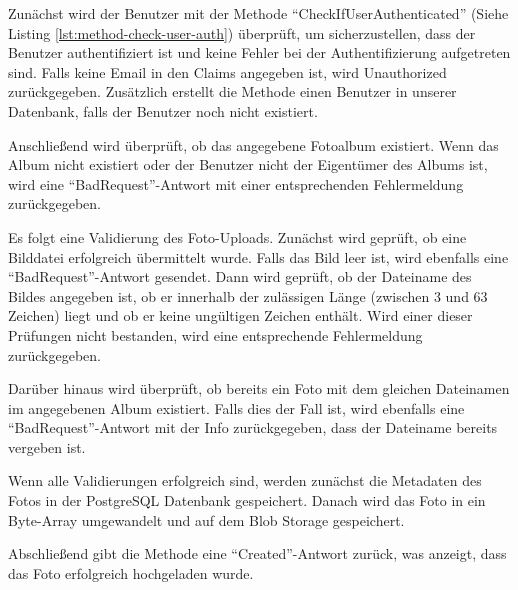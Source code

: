 Zunächst wird der Benutzer mit der Methode ``CheckIfUserAuthenticated'' (Siehe Listing 
\ref{lst:method-check-user-auth}) überprüft, um sicherzustellen, dass der Benutzer 
authentifiziert ist und keine Fehler bei der Authentifizierung aufgetreten sind. 
Falls keine Email in den Claims angegeben ist, wird Unauthorized zurückgegeben. 
Zusätzlich erstellt die Methode einen Benutzer in unserer Datenbank, falls
der Benutzer noch nicht existiert.

Anschließend wird überprüft, ob das angegebene Fotoalbum existiert. Wenn das 
Album nicht existiert oder der Benutzer nicht der Eigentümer des Albums ist, 
wird eine ``BadRequest''-Antwort mit einer entsprechenden Fehlermeldung zurückgegeben.

Es folgt eine Validierung des Foto-Uploads. Zunächst wird geprüft, ob eine Bilddatei 
erfolgreich übermittelt wurde. Falls das Bild leer ist, wird ebenfalls eine 
``BadRequest''-Antwort gesendet. Dann wird geprüft, ob der Dateiname des Bildes 
angegeben ist, ob er innerhalb der zulässigen Länge (zwischen 3 und 63 Zeichen) liegt 
und ob er keine ungültigen Zeichen enthält. Wird einer dieser Prüfungen nicht bestanden, 
wird eine entsprechende Fehlermeldung zurückgegeben.

Darüber hinaus wird überprüft, ob bereits ein Foto mit dem gleichen Dateinamen im 
angegebenen Album existiert. Falls dies der Fall ist, wird ebenfalls eine 
``BadRequest''-Antwort mit der Info zurückgegeben, dass der Dateiname bereits vergeben ist.

Wenn alle Validierungen erfolgreich sind, werden zunächst die Metadaten des Fotos in der
PostgreSQL Datenbank gespeichert. Danach wird das Foto in ein Byte-Array umgewandelt und auf
dem Blob Storage gespeichert.

Abschließend gibt die Methode eine ``Created''-Antwort zurück, was anzeigt, dass das Foto 
erfolgreich hochgeladen wurde.


